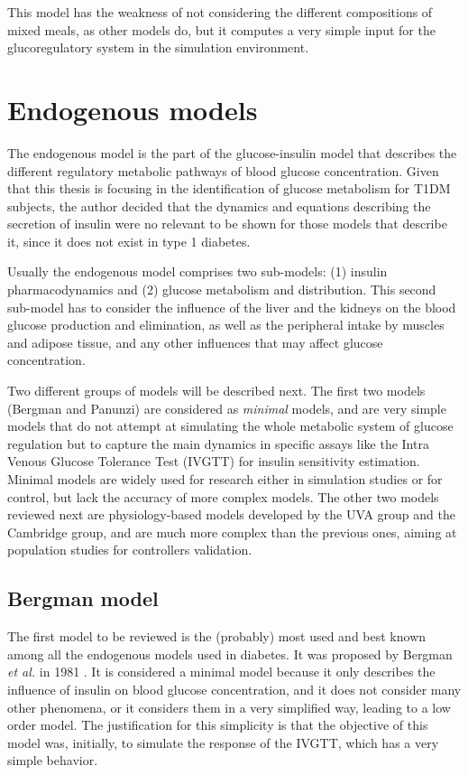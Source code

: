 This model has the weakness of not considering the different compositions of mixed meals, as other models do, but it computes a very simple input for the glucoregulatory system in the simulation environment.

\section{Endogenous models}
\label{sec:EndogenousModels}

The endogenous model is the part of the glucose-insulin model that describes the different regulatory metabolic pathways of blood glucose concentration. Given that this thesis is focusing in the identification of glucose metabolism for T1DM subjects, the author decided that the dynamics and equations describing the secretion of insulin were no relevant to be shown for those models that describe it, since it does not exist in type 1 diabetes.

Usually the endogenous model comprises two sub-models: (1) insulin pharmacodynamics and (2) glucose metabolism and distribution. This second sub-model has to consider the influence of the liver and the kidneys on the blood glucose production and elimination, as well as the peripheral intake by muscles and adipose tissue, and any other influences that may affect glucose concentration. 

Two different groups of models will be described next. The first two models (Bergman and Panunzi) are considered as \textit{minimal} models, and are very simple models that do not attempt at simulating the whole metabolic system of glucose regulation but to capture the main dynamics in specific assays like the Intra Venous Glucose Tolerance Test (IVGTT) for insulin sensitivity estimation. Minimal models are widely used for research either in simulation studies or for control, but lack the accuracy of more complex models. The other two models reviewed next are physiology-based models developed by the UVA group and the Cambridge group, and are much more complex than the previous ones, aiming at population studies for controllers validation.

\subsection{Bergman model}
\label{sec:BergmanEtAl}

The first model to be reviewed is the (probably) most used and best known among all the endogenous models used in diabetes. It was proposed by Bergman \textit{et al.} in 1981 \cite{bergman1981physiologic}. It is considered a minimal model because it only describes the influence of insulin on blood glucose concentration, and it does not consider many other phenomena, or it considers them in a very simplified way, leading to a low order model. The justification for this simplicity is that the objective of this model was, initially, to simulate the response of the IVGTT, which has a very simple behavior.

